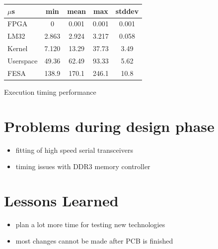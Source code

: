 \documentclass[25pt,halfparskip-,pagesize]{scrartcl}
\begin{document}
\begin{multicols*}{3}
   \begin{tabular}{l|c|c|c|c}
     $\mu$s    & min   & mean  & max   & stddev \\
     \hline
     FPGA      & 0 & 0.001 & 0.001 & 0.001 \\
     LM32      & 2.863 & 2.924 & 3.217 & 0.058  \\
     Kernel    & 7.120 & 13.29 & 37.73 & 3.49   \\
     Userspace & 49.36 & 62.49 & 93.33 & 5.62   \\
     FESA      & 138.9 & 170.1 & 246.1 & 10.8 \\
   \end{tabular}
   \caption{Execution timing performance}
  \label{tab:stat_table}





\section{Problems during design phase}
\begin{itemize}
	\item fitting of high speed serial transceivers
	\item timing issues with DDR3 memory controller
\end{itemize}

\section{Lessons Learned}
\begin{itemize}
	\item plan a lot more time for testing new technologies
	\item most changes cannot be made after PCB is finished
\end{itemize}



\end{multicols*}
\end{document}
